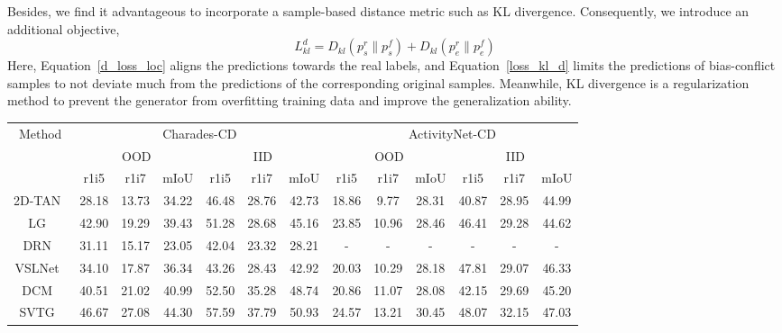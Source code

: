 Besides, we find it advantageous to incorporate a sample-based distance metric such as KL divergence. Consequently, we introduce an additional objective, 
\begin{equation}
	L^d_{kl} = D_{kl}(p_{s}^{r} \| p_{s}^{f}) + D_{kl}(p_{e}^{r} \| p_{e}^{f})
	\label{loss_kl_d}
\end{equation}
Here, Equation~\ref{d_loss_loc} aligns the predictions towards the real labels, and Equation~\ref{loss_kl_d} limits the predictions of bias-conflict samples to not deviate much from the predictions of the corresponding original samples. 
Meanwhile, KL divergence is a regularization method to prevent the generator from overfitting training data and improve the generalization ability. 


\begin{table}[t]
	\centering
	\renewcommand{\arraystretch}{1}
	\setlength{\tabcolsep}{1.4mm}
	\begin{tabular}{c c c c | c c c|c c c | c c c}
		\toprule
		\multirow{3}{*}{Method}
		& \multicolumn{6}{c}{Charades-CD} & \multicolumn{6}{c}{ActivityNet-CD} \\
		& \multicolumn{3}{c}{OOD} & \multicolumn{3}{c}{IID} & \multicolumn{3}{c}{OOD} & \multicolumn{3}{c}{IID}\\
		& r1i5 & r1i7 & mIoU & r1i5 & r1i7 & mIoU & r1i5 & r1i7 & mIoU & r1i5 & r1i7 & mIoU \\
		\midrule
		2D-TAN~\cite{RN2} & 28.18 & 13.73 & 34.22 & 46.48 & 28.76 & 42.73 & 18.86 & 9.77 & 28.31 & 40.87 & 28.95 & 44.99\\
		
		LG~\cite{RN21} & 42.90 & 19.29 & 39.43 & 51.28 & 28.68 & 45.16 &
		23.85 & 10.96 & 28.46 & 46.41 & 29.28 & 44.62\\
		
		DRN~\cite{RN20} & 31.11 & 15.17 & 23.05 & 42.04 & 23.32 & 28.21 & 
		- & - & - & - & - & -\\
		
		VSLNet~\cite{RN4} & 34.10 & 17.87 & 36.34 & 43.26 & 28.43 & 42.92 &
		20.03 & 10.29 & 28.18 & 47.81 & 29.07 & 46.33\\
		
		DCM~\cite{RN29} & 40.51 & 21.02 & 40.99 & 52.50 & 35.28 & 48.74 & 20.86 & 11.07 & 28.08 & 42.15 & 29.69 & 45.20\\
		
		SVTG~\cite{RN30} & 46.67 & 27.08 & 44.30 & 57.59 & 37.79 & 50.93 &
		24.57 & 13.21 & 30.45 & 48.07 & 32.15 & 47.03\\
		

\end{tabular}
\end{table}
